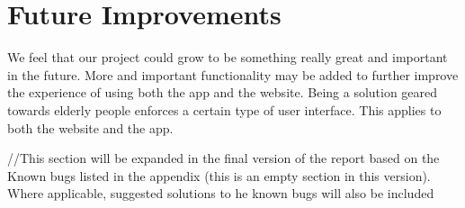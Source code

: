 \chapter{Future Improvements}



We feel that our project could grow to be something really great and important in the future. More and important functionality may be added to further improve the experience of using both the app and the website. Being a solution geared towards elderly people enforces a certain type of user interface. This applies to both the website and the app.


//This section will be expanded in the final version of the report based on the Known bugs listed in the appendix (this is an empty section in this version).
Where applicable, suggested solutions to he known bugs will also be included